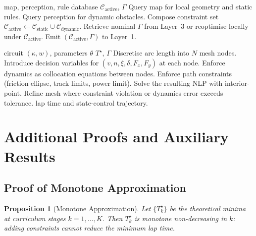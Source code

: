 \documentclass[11pt,twocolumn]{article}
\newtheorem{proposition}[theorem]{Proposition}
\theoremstyle{definition}
\theoremstyle{remark}
\providecommand{\cC}{\mathcal{C}}
\begin{document}
\begin{algorithm}[H]
\caption{Constraint manager (Layer~2)}
\label{alg:layer2}
\begin{algorithmic}[1]
\Require map, perception, rule database
\Ensure $\cC_{\mathrm{active}}$, $\Gamma$
\State Query map for local geometry and static rules.
\State Query perception for dynamic obstacles.
\State Compose constraint set $\cC_{\mathrm{active}} \leftarrow \cC_{\mathrm{static}} \cup \cC_{\mathrm{dynamic}}$.
\State Retrieve nominal $\Gamma$ from Layer~3 or reoptimise locally under $\cC_{\mathrm{active}}$.
\State Emit $(\cC_{\mathrm{active}}, \Gamma)$ to Layer~1.
\end{algorithmic}
\end{algorithm}

\begin{algorithm}[H]
\caption{Direct-transcription lap-time solver (sketch)}
\label{alg:transcription}
\begin{algorithmic}[1]
\Require circuit $(\kappa, w)$, parameters $\theta$
\Ensure $T^{\star}$, $\Gamma$
\State Discretise arc length into $N$ mesh nodes.
\State Introduce decision variables for $(v, n, \xi, \delta, F_x, F_y)$ at each node.
\State Enforce dynamics as collocation equations between nodes.
\State Enforce path constraints (friction ellipse, track limits, power limit).
\State Solve the resulting NLP with interior-point.
\State Refine mesh where constraint violation or dynamics error exceeds tolerance.
\State \Return lap time and state-control trajectory.
\end{algorithmic}
\end{algorithm}

\section{Additional Proofs and Auxiliary Results}
\label{app:additional}

\subsection{Proof of Monotone Approximation}

\begin{proposition}[Monotone Approximation]\label{prop:monotone-approx}
Let $\{T^{\star}_k\}$ be the theoretical minima at curriculum stages $k = 1, \ldots, K$. Then $T^{\star}_k$ is monotone non-decreasing in $k$: adding constraints cannot reduce the minimum lap time.
\end{proposition}
\end{document}
